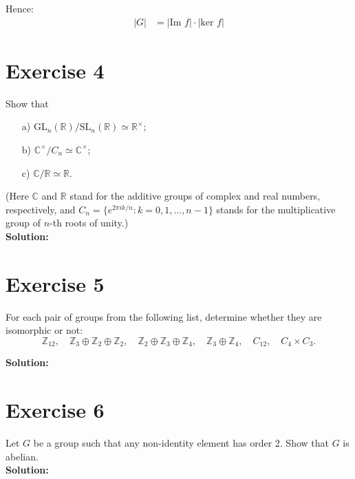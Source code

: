 \documentclass{article}
\begin{document}
Hence:
\begin{align*}
   |G| &= |\text{Im } f| \cdot |\text{ker } f|
\end{align*}

\newpage

\section*{Exercise 4}
Show that
\begin{itemize}
\item[a)] $\text{GL}_n(\mathbb{R})/\text{SL}_n(\mathbb{R}) \simeq \mathbb{R}^\times$;
\item[b)] $\mathbb{C}^\times/C_n \simeq \mathbb{C}^\times$;
\item[c)] $\mathbb{C}/\mathbb{R} \simeq \mathbb{R}$.
\end{itemize}
(Here $\mathbb{C}$ and $\mathbb{R}$ stand for the additive groups of complex and real numbers, respectively, and $C_n = \{e^{2\pi i k/n}: k = 0,1,...,n-1\}$ stands for the multiplicative group of $n$-th roots of unity.) \\

\textbf{Solution:} \\



\newpage

\section*{Exercise 5}
For each pair of groups from the following list, determine whether they are isomorphic or not:
\[ \mathbb{Z}_{12}, \quad \mathbb{Z}_3 \oplus \mathbb{Z}_2 \oplus \mathbb{Z}_2, \quad \mathbb{Z}_2 \oplus \mathbb{Z}_3 \oplus \mathbb{Z}_4, \quad \mathbb{Z}_3 \oplus \mathbb{Z}_4, \quad C_{12}, \quad C_4 \times C_3. \]

\textbf{Solution:} \\



\newpage

\section*{Exercise 6}
Let $G$ be a group such that any non-identity element has order 2. Show that $G$ is abelian. \\

\textbf{Solution:} \\
\end{document}
